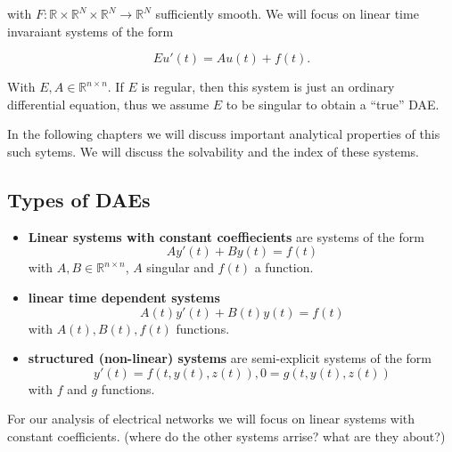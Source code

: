 \documentclass[11pt,titlepage]{article}
\begin{document}
			with $F:\mathbb{R} \times \mathbb{R}^N \times \mathbb{R}^N \to \mathbb{R}^N$ sufficiently smooth. We will focus on linear time invaraiant systems of the form
			
			\begin{displaymath}
				E u'(t) = A u(t) + f(t).
			\end{displaymath}
			
			With $E, A \in \mathbb{R}^{n \times n}$. If $E$ is regular, then this system is just an ordinary differential equation, thus we assume $E$ to be singular to obtain a ``true'' DAE. 
			
			In the following chapters we will discuss important analytical properties of this such sytems. We will discuss the solvability and the index of these systems.
			
		\subsection{Types of DAEs}
		
			\begin{itemize}
				\item \textbf{Linear systems with constant coeffiecients} \newline
					are systems of the form 
					\begin{equation}
						\label{DAE-const-coeff}
						A y'(t) + B y(t) = f(t)
					\end{equation}
					with $A,B \in \mathbb{R}^{n \times n}$, $A$ singular and $f(t)$ a function.
				\item \textbf{linear time dependent systems} \newline
					\begin{displaymath}
						A(t) y'(t) + B(t) y(t) = f(t)
					\end{displaymath}
					with $A(t),B(t),f(t)$ functions.
				\item  \textbf{structured (non-linear) systems} \newline
					are semi-explicit systems of the form
					\begin{displaymath}
						y'(t) = f(t, y(t), z(t)),
						0 = g(t,y(t),z(t))
					\end{displaymath}
					with $f$ and $g$ functions.
			\end{itemize}
			
			For our analysis of electrical networks we will focus on linear systems with constant coefficients. (where do the other systems arrise? what are they about?)
			
\end{document}
